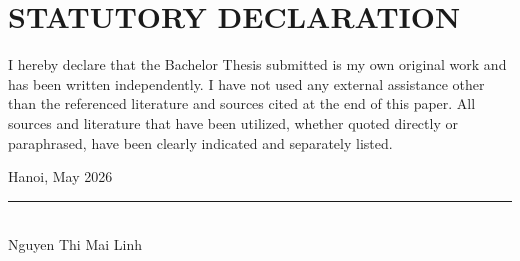 \chapter*{STATUTORY DECLARATION}

I hereby declare that the Bachelor Thesis submitted is my own original work and has been
written independently. I have not used any external assistance other than the referenced
literature and sources cited at the end of this paper. All sources and literature that have
been utilized, whether quoted directly or paraphrased, have been clearly indicated and
separately listed.

\vspace{1.5cm}
\begin{flushright}
  Hanoi, May 2026\\[1cm]
  \rule{5cm}{0.4pt}\\
  Nguyen Thi Mai Linh
\end{flushright}
